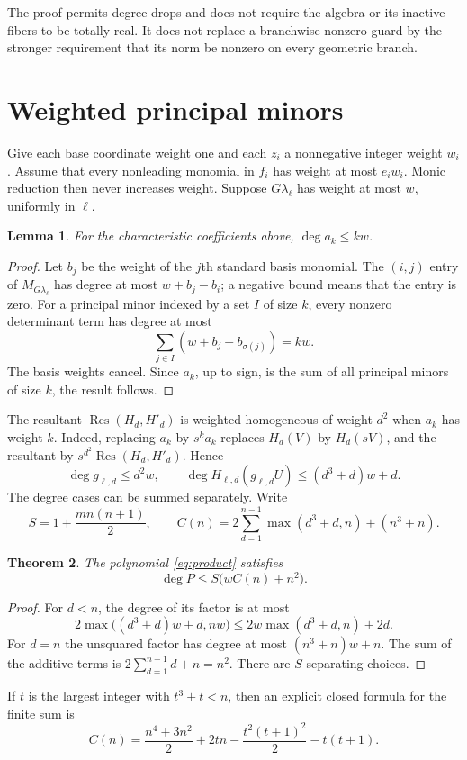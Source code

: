 \documentclass[11pt,a4paper]{article}
\newtheorem{theorem}{Theorem}[section]
\newtheorem{lemma}[theorem]{Lemma}
\DeclareMathOperator{\Res}{Res}
\begin{document}
The proof permits degree drops and does not require the algebra
or its inactive fibers to be totally real. It does not replace a
branchwise nonzero guard by the stronger requirement that its norm
be nonzero on every geometric branch.

\section{Weighted principal minors}

Give each base coordinate weight one and each $z_i$ a nonnegative
integer weight $w_i$. Assume that every nonleading monomial in
$f_i$ has weight at most $e_iw_i$. Monic reduction then never
increases weight. Suppose $G\lambda_\ell$ has weight at most
$w$, uniformly in $\ell$.

\begin{lemma}\label{lem:minors}
For the characteristic coefficients above, $\deg a_k\le kw$.
\end{lemma}
\begin{proof}
Let $b_j$ be the weight of the $j$th standard basis monomial.
The $(i,j)$ entry of $M_{G\lambda_\ell}$ has degree at most
$w+b_j-b_i$; a negative bound means that the entry is zero.
For a principal minor indexed by a set $I$ of size $k$, every
nonzero determinant term has degree at most
\[
 \sum_{j\in I}(w+b_j-b_{\sigma(j)})=kw.
\]
The basis weights cancel. Since $a_k$, up to sign, is the sum
of all principal minors of size $k$, the result follows.
\end{proof}

The resultant $\Res(H_d,H'_d)$ is weighted homogeneous of
weight $d^2$ when $a_k$ has weight $k$. Indeed, replacing $a_k$
by $s^ka_k$ replaces $H_d(V)$ by $H_d(sV)$, and the resultant
by $s^{d^2}\Res(H_d,H'_d)$. Hence
\[
 \deg g_{\ell,d}\le d^2w,
 \qquad
 \deg H_{\ell,d}(g_{\ell,d}U)
       \le (d^3+d)w+d.
\]
The degree cases can be summed separately. Write
\[
 S=1+\frac{m n(n+1)}2,
 \qquad
 C(n)=2\sum_{d=1}^{n-1}\max(d^3+d,n)+(n^3+n).
\]

\begin{theorem}\label{thm:degree}
The polynomial \eqref{eq:product} satisfies
\begin{equation}\label{eq:degreebound}
                 \deg P\le S\bigl(wC(n)+n^2\bigr).
\end{equation}
\end{theorem}
\begin{proof}
For $d<n$, the degree of its factor is at most
\[
 2\max\bigl((d^3+d)w+d,nw\bigr)
       \le2w\max(d^3+d,n)+2d.
\]
For $d=n$ the unsquared factor has degree at most
$(n^3+n)w+n$. The sum of the additive terms is
$2\sum_{d=1}^{n-1}d+n=n^2$. There are $S$ separating choices.
\end{proof}
If $t$ is the largest integer with $t^3+t<n$, then an explicit
closed formula for the finite sum is
\begin{equation}\label{eq:Cclosed}
 C(n)=\frac{n^4+3n^2}{2}+2tn
       -\frac{t^2(t+1)^2}{2}-t(t+1).
\end{equation}
\end{document}
